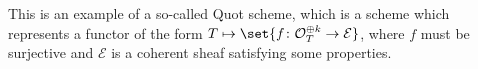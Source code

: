 This is an example of a so-called Quot scheme, which is a scheme which represents
a functor of the form $T\mapsto \set{f\colon \mathcal{O}_T^{\oplus k}\to \mathcal{E}}$,
where $f$ must be surjective and $\mathcal{E}$ is a coherent sheaf satisfying
some properties.
